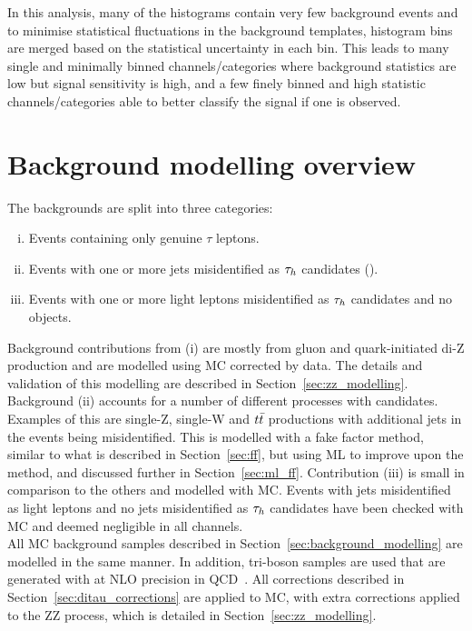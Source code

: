 In this analysis, many of the histograms contain very few background events and to minimise statistical fluctuations in the background templates, histogram bins are merged based on the statistical uncertainty in each bin.
This leads to many single and minimally binned channels/categories where background statistics are low but signal sensitivity is high, and a few finely binned and high statistic channels/categories able to better classify the signal if one is observed.
 
\section{Background modelling overview}

The backgrounds are split into three categories:
\begin{enumerate}[i)]
  \item Events containing only genuine $\tau$ leptons.
  \item Events with one or more jets misidentified as $\tau_{h}$ candidates (\jtth).
  \item Events with one or more light leptons misidentified as $\tau_{h}$ candidates and no \jtth objects. 
\end{enumerate}

Background contributions from (i) are mostly from gluon and quark-initiated di-Z production and are modelled using \ac{MC} corrected by data.
The details and validation of this modelling are described in Section~\ref{sec:zz_modelling}.
Background (ii) accounts for a number of different processes with \jtth candidates.
Examples of this are single-Z, single-W and $t\bar{t}$ productions with additional jets in the events being misidentified.
This is modelled with a fake factor method, similar to what is described in Section~\ref{sec:ff}, but using \ac{ML} to improve upon the method, and discussed further in Section~\ref{sec:ml_ff}.
Contribution (iii) is small in comparison to the others and modelled with \ac{MC}.
Events with jets misidentified as light leptons and no jets misidentified as $\tau_{h}$ candidates have been checked with \ac{MC} and deemed negligible in all channels. \\

All \ac{MC} background samples described in Section~\ref{sec:background_modelling} are modelled in the same manner.  
In addition, tri-boson samples are used that are generated with \MGvATNLO at \ac{NLO} precision in QCD~\cite{Alwall:2011uj}.
All corrections described in Section~\ref{sec:ditau_corrections} are applied to \ac{MC}, with extra corrections applied to the ZZ process, which is detailed in Section~\ref{sec:zz_modelling}.

